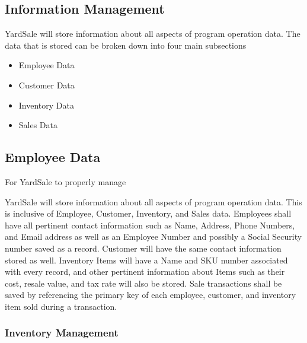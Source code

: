 \documentclass{report}
\begin{document}
    \subsection{Information Management}
    YardSale will store information about all aspects of program operation
    data. The data that is stored can be broken down into four main subsections
    \begin{itemize}
	\item{Employee Data}
	\item{Customer Data}
	\item{Inventory Data}
	\item{Sales Data}
    \end{itemize}

    \subsection{Employee Data}
    For YardSale to properly manage 


    YardSale will store information about all aspects of program operation
    data. This is inclusive of Employee, Customer, Inventory, and Sales
    data. Employees shall have all pertinent contact information such
    as Name, Address, Phone Numbers, and Email address as well as an
    Employee Number and possibly a Social Security number saved as a
    record. Customer will have the same contact information stored as
    well. Inventory Items will have a Name and SKU number associated
    with every record, and other pertinent information about Items
    such as their cost, resale value, and tax rate will also be stored.
    Sale transactions shall be saved by referencing the primary key of
    each employee, customer, and inventory item sold during a transaction.


    \subsubsection{Inventory Management}
\end{document}
